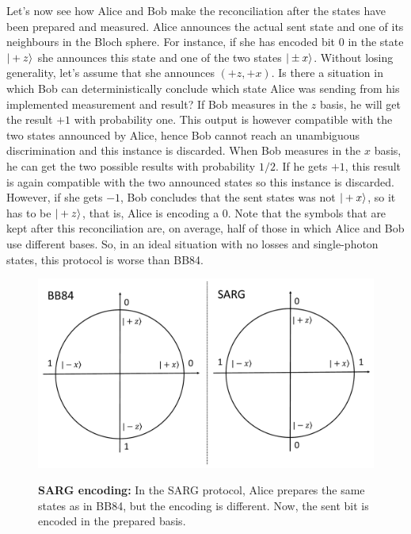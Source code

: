\documentclass[a4paper]{article}
\begin{document}
Let's now see how Alice and Bob make the reconciliation after the states have been prepared and measured. Alice announces the actual sent state and one of its neighbours in the Bloch sphere. For instance, if she has encoded bit $0$ in the state $|+z\rangle$ she announces this state and one of the two states $|\pm x\rangle$. Without losing generality, let's assume that she announces $(+z,+x)$. Is there a situation in which Bob can deterministically conclude which state Alice was sending from his implemented measurement and result? If Bob measures in the $z$ basis, he will get the result $+1$ with probability one. This output is however compatible with the two states announced by Alice, hence Bob cannot reach an unambiguous discrimination and this instance is discarded. When Bob measures in the $x$ basis, he can get the two possible results with probability $1/2$. If he gets $+1$, this result is again compatible with the two announced states so this instance is discarded. However, if she gets $-1$, Bob concludes that the sent states was not $|+x\rangle$, so it has to be $|+z\rangle$, that is, Alice is encoding a $0$. Note that the symbols that are kept after this reconciliation are, on average, half of those in which Alice and Bob use different bases. So, in an ideal situation with no losses and single-photon states, this protocol is worse than BB84. 

\begin{figure}
\begin{center}
  \includegraphics[width=12cm]{SARG.pdf}\\
  \caption{\textbf{SARG encoding:} In the SARG protocol, Alice prepares the same states as in BB84, but the encoding is different. Now, the sent bit is encoded in the prepared basis.}\label{SARGfig}
\end{center}
\end{figure}
\end{document}
